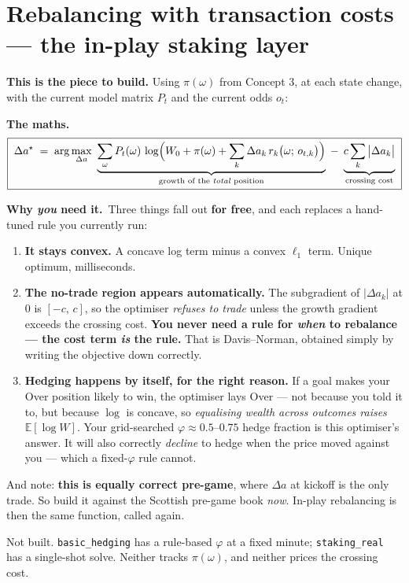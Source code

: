 \documentclass[11pt,a4paper]{article}
\newcommand{\formula}[1]{\smallskip\noindent\textbf{\small The maths.}\ #1}
\newcommand{\whyyou}[1]{\smallskip\noindent\textbf{\small Why \emph{you} need it.}\ \small #1\normalsize}
\begin{document}
\section{Rebalancing with transaction costs --- the in-play staking layer}

\textbf{This is the piece to build.} Using $\pi(\omega)$ from Concept 3, at each state change, with the
current model matrix $P_t$ and the current odds $o_t$:

\formula{
\[
  \boxed{\;
  \Delta a^\star \;=\; \arg\max_{\Delta a}\
  \underbrace{\sum_{\omega} P_t(\omega)\,
    \log\!\Big(W_0 + \pi(\omega) + \sum_k \Delta a_k\, r_k\big(\omega;\, o_{t,k}\big)\Big)}_{\text{growth of the \emph{total} position}}
  \;-\;
  \underbrace{c\sum_k \big|\Delta a_k\big|}_{\text{crossing cost}}
  \;}
\]}

\whyyou{Three things fall out \textbf{for free}, and each replaces a hand-tuned rule you currently run:

\begin{enumerate}
\item \textbf{It stays convex.} A concave log term minus a convex $\ell_1$ term. Unique optimum, milliseconds.
\item \textbf{The no-trade region appears automatically.} The subgradient of $|\Delta a_k|$ at $0$ is
      $[-c,\,c]$, so the optimiser \emph{refuses to trade} unless the growth gradient exceeds the crossing
      cost. \textbf{You never need a rule for \emph{when} to rebalance --- the cost term \emph{is} the rule.}
      That is Davis--Norman, obtained simply by writing the objective down correctly.
\item \textbf{Hedging happens by itself, for the right reason.} If a goal makes your Over position likely to
      win, the optimiser lays Over --- not because you told it to, but because $\log$ is concave, so
      \emph{equalising wealth across outcomes raises} $\mathbb{E}[\log W]$. Your grid-searched
      $\varphi \approx 0.5$--$0.75$ hedge fraction is this optimiser's answer. It will also correctly
      \emph{decline} to hedge when the price moved against you --- which a fixed-$\varphi$ rule cannot.
\end{enumerate}

\smallskip
And note: \textbf{this is equally correct pre-game}, where $\Delta a$ at kickoff is the only trade. So build
it against the Scottish pre-game book \emph{now}. In-play rebalancing is then the same function, called
again.}

\begin{gapbox}
Not built. \texttt{basic\_hedging} has a rule-based $\varphi$ at a fixed minute; \texttt{staking\_real} has a
single-shot solve. Neither tracks $\pi(\omega)$, and neither prices the crossing cost.
\end{gapbox}
\end{document}
